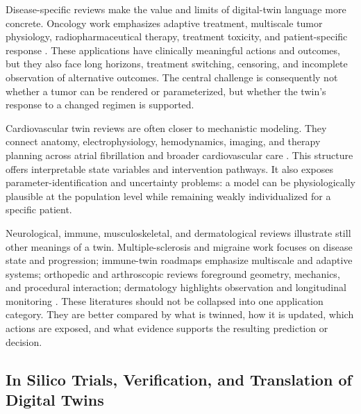 Disease-specific reviews make the value and limits of digital-twin language more concrete. Oncology work emphasizes adaptive treatment, multiscale tumor physiology, radiopharmaceutical therapy, treatment toxicity, and patient-specific response \citep{Karaman2025Fromdatadriven,John2025systematicreviewAI,Shen2025Fromvirtualreality,Omolayo2022DigitalTwinFrameworks,Thiong_o2022DigitalTwinTechnology,Rahmim2022Theranosticdigitaltwins,Wang2024Fromvirtualpatients,Witt2026DigitalTwinsCatalysts,Elsayed2026DigitalTwinModels}. These applications have clinically meaningful actions and outcomes, but they also face long horizons, treatment switching, censoring, and incomplete observation of alternative outcomes. The central challenge is consequently not whether a tumor can be rendered or parameterized, but whether the twin's response to a changed regimen is supported.

Cardiovascular twin reviews are often closer to mechanistic modeling. They connect anatomy, electrophysiology, hemodynamics, imaging, and therapy planning across atrial fibrillation and broader cardiovascular care \citep{Coorey2022healthdigitaltwin,Trayanova2023Updigitalpersonal,Thangaraj2024Cardiovascularcaredigital,Sel2024BuildingDigitalTwins,Karakasis2025DigitalTwinModels}. This structure offers interpretable state variables and intervention pathways. It also exposes parameter-identification and uncertainty problems: a model can be physiologically plausible at the population level while remaining weakly individualized for a specific patient.

Neurological, immune, musculoskeletal, and dermatological reviews illustrate still other meanings of a twin. Multiple-sclerosis and migraine work focuses on disease state and progression; immune-twin roadmaps emphasize multiscale and adaptive systems; orthopedic and arthroscopic reviews foreground geometry, mechanics, and procedural interaction; dermatology highlights observation and longitudinal monitoring \citep{Voigt2021DigitalTwinsMultiple,Gazerani2023IntelligentDigitalTwins,Laubenbacher2022Buildingdigitaltwins,Diniz2025Digitaltwinsystems,Bjelland2022TowardDigitalTwin,Akbarialiabad2024Digitaltwinsdermatology}. These literatures should not be collapsed into one application category. They are better compared by what is twinned, how it is updated, which actions are exposed, and what evidence supports the resulting prediction or decision.

\subsection{In Silico Trials, Verification, and Translation of Digital Twins}

